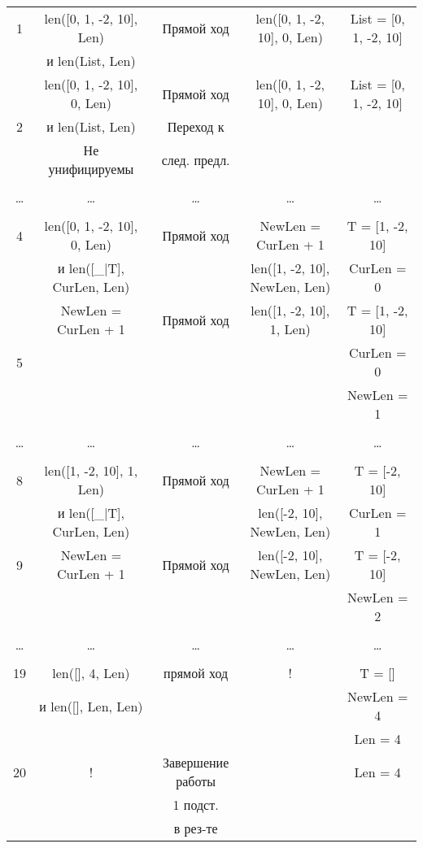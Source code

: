 \begin{landscape}
\begin{longtable}{|c|c|c|c|c|}
        \hline
            1 & len([0, 1, -2, 10], Len) & Прямой ход & len([0, 1, -2, 10], 0, Len) & List = [0, 1, -2, 10]\\
             & и len(List, Len) & & &\\
			\hline
			 & len([0, 1, -2, 10], 0, Len) & Прямой ход & len([0, 1, -2, 10], 0, Len) & List = [0, 1, -2, 10]\\
            2 & и len(List, Len) & Переход к & &\\
             & Не унифицируемы & след. предл. & &\\
            \hline
			&&&&\\
			\dots & \dots & \dots & \dots & \dots \\
			&&&&\\
			\hline 
			4 & len([0, 1, -2, 10], 0, Len) & Прямой ход & NewLen = CurLen + 1 & T = [1, -2, 10]\\
              & и len([\_|T], CurLen, Len) & & len([1, -2, 10], NewLen, Len) & CurLen = 0\\
            \hline 
		     & NewLen = CurLen + 1 & Прямой ход & len([1, -2, 10], 1, Len) & T = [1, -2, 10]\\
            5 & & & & CurLen = 0\\
             & & & & NewLen = 1\\
            \hline
			&&&&\\
			\dots & \dots & \dots & \dots & \dots \\
			&&&&\\
            \hline 
		    8 & len([1, -2, 10], 1, Len) & Прямой ход & NewLen = CurLen + 1 & T = [-2, 10]\\
              & и len([\_|T], CurLen, Len) & & len([-2, 10], NewLen, Len) & CurLen = 1\\
            \hline 
		    9 & NewLen = CurLen + 1 & Прямой ход & len([-2, 10], NewLen, Len) & T = [-2, 10]\\
              & & &  & NewLen = 2\\
            \hline
			&&&&\\
			\dots & \dots & \dots & \dots & \dots \\
			&&&&\\
			\hline 
		    19 & len([], 4, Len) & прямой ход & ! & T = []\\
              & и len([], Len, Len) & &  & NewLen = 4\\
              & & &  & Len = 4\\
            \hline 
		    20 & ! & Завершение работы & & Len = 4\\
              & & 1 подст. &  & \\
              & & в рез-те & & \\
    \end{longtable}
\end{landscape}